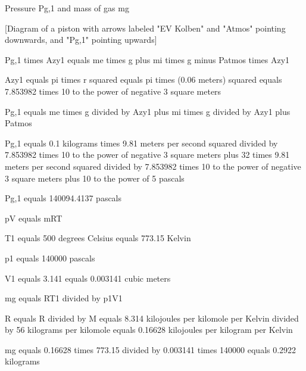 Pressure Pg,1 and mass of gas mg

[Diagram of a piston with arrows labeled "EV Kolben" and "Atmos" pointing downwards, and "Pg,1" pointing upwards]

Pg,1 times Azy1 equals me times g plus mi times g minus Patmos times Azy1

Azy1 equals pi times r squared equals pi times (0.06 meters) squared equals 7.853982 times 10 to the power of negative 3 square meters

Pg,1 equals me times g divided by Azy1 plus mi times g divided by Azy1 plus Patmos

Pg,1 equals 0.1 kilograms times 9.81 meters per second squared divided by 7.853982 times 10 to the power of negative 3 square meters plus 32 times 9.81 meters per second squared divided by 7.853982 times 10 to the power of negative 3 square meters plus 10 to the power of 5 pascals

Pg,1 equals 140094.4137 pascals

pV equals mRT

T1 equals 500 degrees Celsius equals 773.15 Kelvin

p1 equals 140000 pascals

V1 equals 3.141 equals 0.003141 cubic meters

mg equals RT1 divided by p1V1

R equals R divided by M equals 8.314 kilojoules per kilomole per Kelvin divided by 56 kilograms per kilomole equals 0.16628 kilojoules per kilogram per Kelvin

mg equals 0.16628 times 773.15 divided by 0.003141 times 140000 equals 0.2922 kilograms